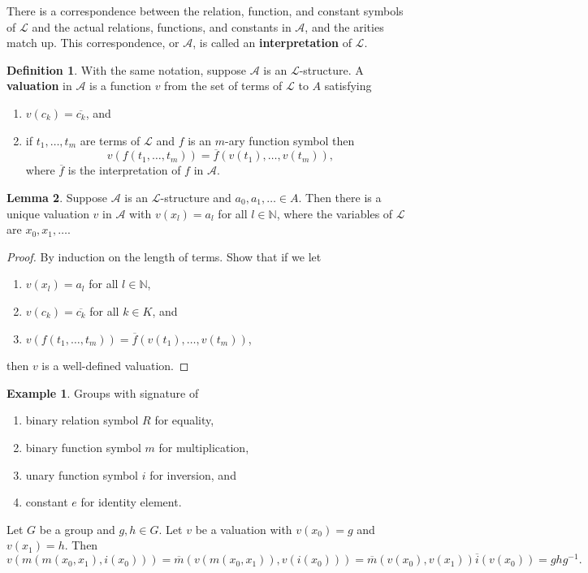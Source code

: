 \documentclass{article}
\newcommand{\N}{\mathbb{N}}
\newcommand{\rb}[1]{\left( #1 \right)}
\theoremstyle{definition}\newtheorem{definition}{Definition}[subsection]
\theoremstyle{definition}\newtheorem{remark}[definition]{Remark}
\theoremstyle{definition}\newtheorem*{example}{Example}
\theoremstyle{definition}\newtheorem*{note}{Note}
\newtheorem{lemma}[definition]{Lemma}
\begin{document}
There is a correspondence between the relation, function, and constant symbols of $ \mathcal{L} $ and the actual relations, functions, and constants in $ \mathcal{A} $, and the arities match up. This correspondence, or $ \mathcal{A} $, is called an \textbf{interpretation} of $ \mathcal{L} $.

\begin{definition}
With the same notation, suppose $ \mathcal{A} $ is an $ \mathcal{L} $-structure. A \textbf{valuation} in $ \mathcal{A} $ is a function $ v $ from the set of terms of $ \mathcal{L} $ to $ A $ satisfying
\begin{enumerate}
\item $ v\rb{c_k} = \overline{c_k} $, and
\item if $ t_1, \dots, t_m $ are terms of $ \mathcal{L} $ and $ f $ is an $ m $-ary function symbol then
$$ v\rb{f\rb{t_1, \dots, t_m}} = \overline{f}\rb{v\rb{t_1}, \dots, v\rb{t_m}}, $$
where $ \overline{f} $ is the interpretation of $ f $ in $ \mathcal{A} $.
\end{enumerate}
\end{definition}

\begin{lemma}
Suppose $ \mathcal{A} $ is an $ \mathcal{L} $-structure and $ a_0, a_1, \dots \in A $. Then there is a unique valuation $ v $ in $ \mathcal{A} $ with $ v\rb{x_l} = a_l $ for all $ l \in \N $, where the variables of $ \mathcal{L} $ are $ x_0, x_1, \dots $.
\end{lemma}

\begin{proof}
By induction on the length of terms. Show that if we let
\begin{enumerate}
\item $ v\rb{x_l} = a_l $ for all $ l \in \N $,
\item $ v\rb{c_k} = \overline{c_k} $ for all $ k \in K $, and
\item $ v\rb{f\rb{t_1, \dots, t_m}} = \overline{f}\rb{v\rb{t_1}, \dots, v\rb{t_m}} $,
\end{enumerate}
then $ v $ is a well-defined valuation.
\end{proof}

\begin{example}
Groups with signature of
\begin{enumerate}
\item binary relation symbol $ R $ for equality,
\item binary function symbol $ m $ for multiplication,
\item unary function symbol $ i $ for inversion, and
\item constant $ e $ for identity element.
\end{enumerate}
Let $ G $ be a group and $ g, h \in G $. Let $ v $ be a valuation with $ v\rb{x_0} = g $ and $ v\rb{x_1} = h $. Then
$$ v\rb{m\rb{m\rb{x_0, x_1}, i\rb{x_0}}} = \overline{m}\rb{v\rb{m\rb{x_0, x_1}}, v\rb{i\rb{x_0}}} = \overline{m}\rb{v\rb{x_0}, v\rb{x_1}}\overline{i}\rb{v\rb{x_0}} = ghg^{-1}. $$
\end{example}
\end{document}
